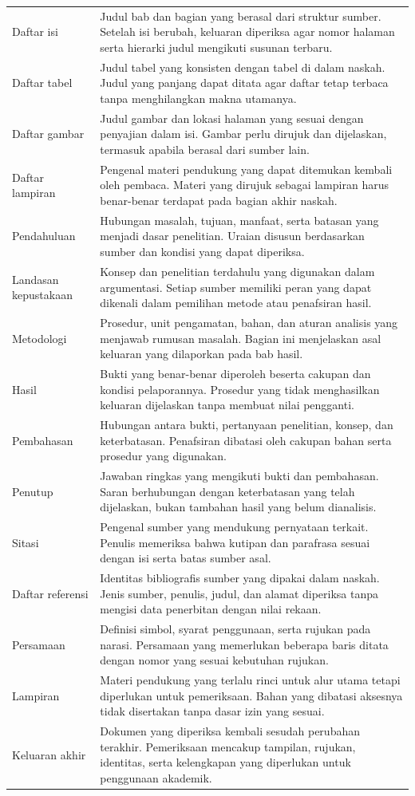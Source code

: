 \begin{longtable}{p{3.5cm}p{9.0cm}}
  Daftar isi & Judul bab dan bagian yang berasal dari struktur sumber. Setelah isi berubah, keluaran diperiksa agar nomor halaman serta hierarki judul mengikuti susunan terbaru. \\
  Daftar tabel & Judul tabel yang konsisten dengan tabel di dalam naskah. Judul yang panjang dapat ditata agar daftar tetap terbaca tanpa menghilangkan makna utamanya. \\
  Daftar gambar & Judul gambar dan lokasi halaman yang sesuai dengan penyajian dalam isi. Gambar perlu dirujuk dan dijelaskan, termasuk apabila berasal dari sumber lain. \\
  Daftar lampiran & Pengenal materi pendukung yang dapat ditemukan kembali oleh pembaca. Materi yang dirujuk sebagai lampiran harus benar-benar terdapat pada bagian akhir naskah. \\
  Pendahuluan & Hubungan masalah, tujuan, manfaat, serta batasan yang menjadi dasar penelitian. Uraian disusun berdasarkan sumber dan kondisi yang dapat diperiksa. \\
  Landasan kepustakaan & Konsep dan penelitian terdahulu yang digunakan dalam argumentasi. Setiap sumber memiliki peran yang dapat dikenali dalam pemilihan metode atau penafsiran hasil. \\
  Metodologi & Prosedur, unit pengamatan, bahan, dan aturan analisis yang menjawab rumusan masalah. Bagian ini menjelaskan asal keluaran yang dilaporkan pada bab hasil. \\
  Hasil & Bukti yang benar-benar diperoleh beserta cakupan dan kondisi pelaporannya. Prosedur yang tidak menghasilkan keluaran dijelaskan tanpa membuat nilai pengganti. \\
  Pembahasan & Hubungan antara bukti, pertanyaan penelitian, konsep, dan keterbatasan. Penafsiran dibatasi oleh cakupan bahan serta prosedur yang digunakan. \\
  Penutup & Jawaban ringkas yang mengikuti bukti dan pembahasan. Saran berhubungan dengan keterbatasan yang telah dijelaskan, bukan tambahan hasil yang belum dianalisis. \\
  Sitasi & Pengenal sumber yang mendukung pernyataan terkait. Penulis memeriksa bahwa kutipan dan parafrasa sesuai dengan isi serta batas sumber asal. \\
  Daftar referensi & Identitas bibliografis sumber yang dipakai dalam naskah. Jenis sumber, penulis, judul, dan alamat diperiksa tanpa mengisi data penerbitan dengan nilai rekaan. \\
  Persamaan & Definisi simbol, syarat penggunaan, serta rujukan pada narasi. Persamaan yang memerlukan beberapa baris ditata dengan nomor yang sesuai kebutuhan rujukan. \\
  Lampiran & Materi pendukung yang terlalu rinci untuk alur utama tetapi diperlukan untuk pemeriksaan. Bahan yang dibatasi aksesnya tidak disertakan tanpa dasar izin yang sesuai. \\
  Keluaran akhir & Dokumen yang diperiksa kembali sesudah perubahan terakhir. Pemeriksaan mencakup tampilan, rujukan, identitas, serta kelengkapan yang diperlukan untuk penggunaan akademik. \\
\end{longtable}
\endgroup

